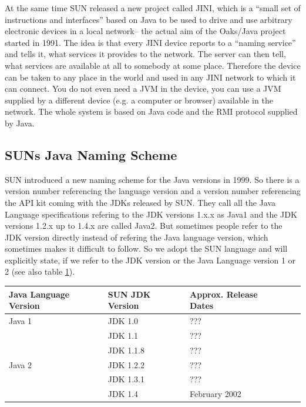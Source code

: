 At the same time SUN released a new project called JINI, which is
a ``small set of instructions and interfaces'' based on Java to
be used to drive and use arbitrary electronic devices in a local network--
the actual aim of the Oaks/Java project started in 1991. The idea is that every 
JINI device reports to a ``naming service'' and tells it, what services
it provides to the network. The server can then tell, what services are
available at all to somebody at some place. Therefore the device can be 
taken to any place in the world and used in any JINI network to which
it can connect. You do not even need a JVM in the device, you can 
use a JVM supplied by a different device (e.g. a computer or browser) 
available in the network. The whole system is based on Java code and
the RMI protocol supplied by Java.

\subsection{SUNs Java Naming Scheme}
\label{sec:NamingScheme}
SUN introduced a new naming scheme for the Java versions in 1999. So there is a 
version number referencing the language version and a version number
referencing the API kit coming with the JDKs released by SUN.
They call all the Java Language specifications refering to the JDK versions
1.x.x as Java1 and the JDK versions 1.2.x up to 1.4.x are called Java2.
But sometimes people refer to the JDK version directly instead of
refering the Java language version, which sometimes makes it difficult to
follow. So we adopt the SUN language and will explicitly state, if we
refer to the JDK version or the Java Language version 1 or 2
(see also table \ref{tab:JavaNamingScheme}).
\begin{table}[htbp]
  \begin{center}
    \leavevmode
    \begin{tabular}{llp{3cm}|c|c}
      Java Language Version & SUN JDK Version & Approx. Release Dates \\\hline  \hline
	Java 1 & JDK 1.0 & ??? \\\hline 
	       & JDK 1.1 & ??? \\\hline 
	       & JDK 1.1.8 & ??? \\\hline 
	Java 2 & JDK 1.2.2 & ??? \\\hline 
	       & JDK 1.3.1 & ??? \\\hline 
	       & JDK 1.4 & February 2002 \\\hline 
    \end{tabular}
  \label{tab:JavaNamingScheme}
  \end{center}
\end{table}

